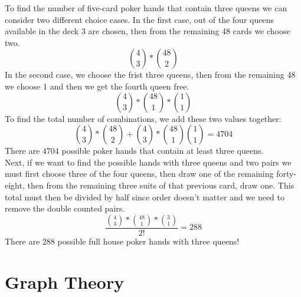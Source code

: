 \documentclass{article}
\begin{document}
To find the number of five-card poker hands that contain three queens we can consider two different choice cases. In the first case, out of the four queens available in the deck 3 are chosen, then from the remaining 48 cards we choose two.
\[\binom{4}{3}*\binom{48}{2}\]
In the second case, we choose the frist three queens, then from the remaining 48 we choose 1 and then we get the fourth queen free.
\[\binom{4}{3}*\binom{48}{1}*\binom{1}{1}\]
To find the total number of combinations, we add these two values together:
\[\binom{4}{3}*\binom{48}{2}+\binom{4}{3}*\binom{48}{1}\binom{1}{1} = 4704\]
There are $4704$ possible poker hands that contain at least three queens.
\\
Next, if we want to find the possible hands with three queens and two pairs we must first choose three of the four queens, then draw one of the remaining forty-eight, then from the remaining three suits of that previous card, draw one. This total must then be divided by half since order doesn't matter and we need to remove the double counted pairs.
\[\frac{\binom{4}{3}*\binom{48}{1}*\binom{3}{1}}{2!} = 288\]
There are $288$ possible full house poker hands with three queens!
\newpage
\section*{Graph Theory}
\end{document}
